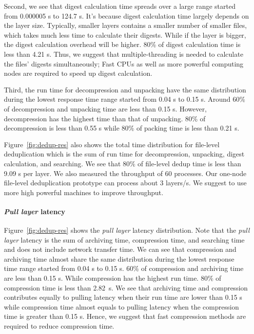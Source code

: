 Second, we see that digest calculation time spreads over a large range started
from 0.000005 s to 124.7 s. 
%
It's because digest calculation time largely
depends on the layer size. 
%
Typically, smaller layers contains a smaller number
of smaller files, which takes much less time to calculate their digests. 
%
While
if the layer is bigger, the digest calculation overhead will be higher. 
%
80\% of
digest calculation time is less than 4.21 s. 
%
Thus, we suggest that multiple-threading is needed to calculate the files'
digests simultaneously; 
%
Fast CPUs as well as more powerful computing nodes are
required to speed up digest calculation.

Third, the run time for decompression and unpacking have the same distribution
during the lowest response time range started from 0.04 s to 0.15 s. 
%
Around
60\% of decompression and unpacking time are less than 0.15 s. 
%
However,
decompression has the highest time than that of unpacking. 
%
80\% of
decompression is less than 0.55 s while 80\% of packing time is less than 0.21 s. 

Figure~\ref{fig:dedup-res} also shows the total time distribution for
file-level deduplication which is the sum of run time for decompression, unpacking,
digest calculation, and searching. 
%
We see that 80\% of file-level dedup time is
less than 9.09 s per layer.
%
%
We also measured the throughput of 60 processes. 
%
Our one-node file-level
deduplication prototype can process about 3 layers/s. 
%
We suggest to use more
high powerful machines to improve throughput.

\paragraph{\emph{Pull layer} latency} Figure~\ref{fig:dedup-res} shows the \emph{pull layer} latency
distribution. 
%
Note that the \emph{pull layer} latency is the sum of archiving time,
compression time, and searching time and does not include network transfer
time. 
%
We can see that compression and archiving time almost share the same
distribution during the lowest response time range started from 0.04 s to 0.15
s. 60\% of compression and archiving time are less than 0.15 s.
%
While
compression has the highest run time. 
%
80\% of compression time is less than 2.82~s. 
%
We see that archiving time and compression contributes equally to pulling
latency when their run time are lower than 0.15 s while compression time almost
equals to pulling latency when the compression time is greater than 0.15 s. 
%
Hence, we
suggest that fast compression methods are required to reduce compression time.  
%


